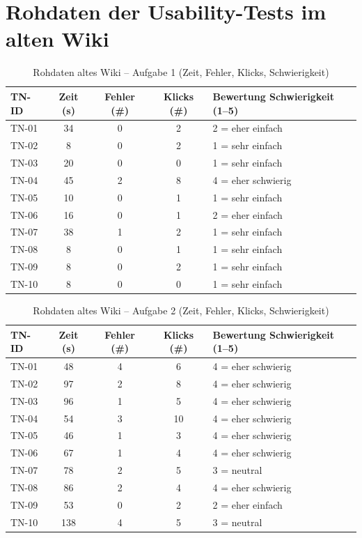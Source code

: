 \section{Rohdaten der Usability-Tests im alten Wiki}
\label{sec:BB-04_usability_alt-tables}

\begin{table}[H]
\centering
\caption{Rohdaten altes Wiki -- Aufgabe 1 (Zeit, Fehler, Klicks, Schwierigkeit)}
\label{tab:BB-alt-task1}
\begin{tabularx}{\textwidth}{l c c c X}
\toprule
TN-ID & Zeit (s) & Fehler (\#) & Klicks (\#) & Bewertung Schwierigkeit (1--5) \\
\midrule
TN-01 & 34 & 0 & 2 & 2 = eher einfach \\
TN-02 & 8 & 0 & 2 & 1 = sehr einfach \\
TN-03 & 20 & 0 & 0 & 1 = sehr einfach \\
TN-04 & 45 & 2 & 8 & 4 = eher schwierig \\
TN-05 & 10 & 0 & 1 & 1 = sehr einfach \\
TN-06 & 16 & 0 & 1 & 2 = eher einfach \\
TN-07 & 38 & 1 & 2 & 1 = sehr einfach \\
TN-08 & 8 & 0 & 1 & 1 = sehr einfach \\
TN-09 & 8 & 0 & 2 & 1 = sehr einfach \\
TN-10 & 8 & 0 & 0 & 1 = sehr einfach \\
\bottomrule
\end{tabularx}
\end{table}

\begin{table}[H]
\centering
\caption{Rohdaten altes Wiki -- Aufgabe 2 (Zeit, Fehler, Klicks, Schwierigkeit)}
\label{tab:BB-alt-task2}
\begin{tabularx}{\textwidth}{l c c c X}
\toprule
TN-ID & Zeit (s) & Fehler (\#) & Klicks (\#) & Bewertung Schwierigkeit (1--5) \\
\midrule
TN-01 & 48 & 4 & 6 & 4 = eher schwierig \\
TN-02 & 97 & 2 & 8 & 4 = eher schwierig \\
TN-03 & 96 & 1 & 5 & 4 = eher schwierig \\
TN-04 & 54 & 3 & 10 & 4 = eher schwierig \\
TN-05 & 46 & 1 & 3 & 4 = eher schwierig \\
TN-06 & 67 & 1 & 4 & 4 = eher schwierig \\
TN-07 & 78 & 2 & 5 & 3 = neutral \\
TN-08 & 86 & 2 & 4 & 4 = eher schwierig \\
TN-09 & 53 & 0 & 2 & 2 = eher einfach \\
TN-10 & 138 & 4 & 5 & 3 = neutral \\
\bottomrule
\end{tabularx}
\end{table}

